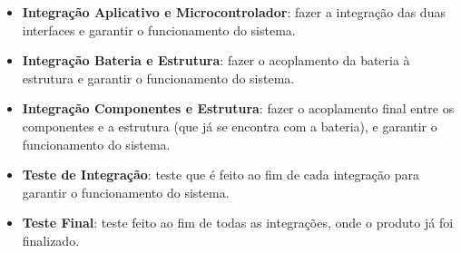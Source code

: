\begin{apendicesenv}
			\begin{itemize}
				\item \textbf{Integração Aplicativo e Microcontrolador}: fazer a integração das duas interfaces e garantir o funcionamento do sistema.
				\item \textbf{Integração Bateria e Estrutura}: fazer o acoplamento da bateria à estrutura e garantir o funcionamento do sistema.
				\item \textbf{Integração Componentes e Estrutura}: fazer o acoplamento final entre os componentes e a estrutura (que já se encontra com a bateria), e garantir o funcionamento do sistema.
				\item \textbf{Teste de Integração}: teste que é feito ao fim de cada integração para garantir o funcionamento do sistema.
				\item \textbf{Teste Final}: teste feito ao fim de todas as integrações, onde o produto já foi finalizado. 
			\end{itemize}
			
			
			
			
	
\end{apendicesenv}

